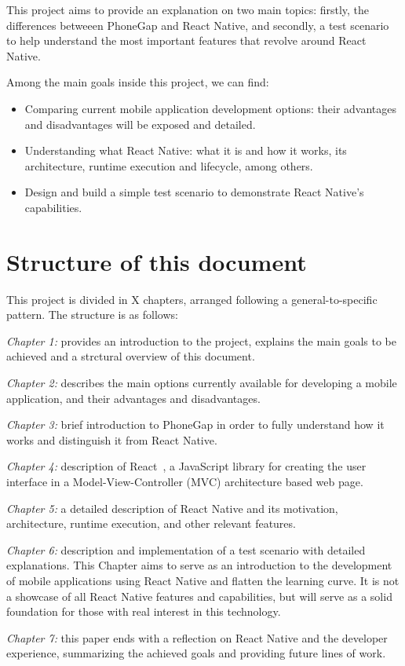 This project aims to provide an explanation on two main topics: firstly, the differences betweeen  PhoneGap and React Native, and secondly, a test scenario to help understand the most important features that revolve around React Native.

Among the main goals inside this project, we can find:

\begin{itemize}  
	\item Comparing current mobile application development options: their advantages and disadvantages will be exposed and detailed.
	\item Understanding what React Native: what it is and how it works, its architecture, runtime execution and lifecycle, among others.
	\item Design and build a simple test scenario to demonstrate React Native's capabilities.
\end{itemize}

\section{Structure of this document}

This project is divided in X chapters, arranged following a general-to-specific pattern. The structure is as follows:

\textit{Chapter 1:} provides an introduction to the project, explains the main goals to be achieved and a strctural overview of this document.

\textit{Chapter 2:} describes the main options currently available for developing a mobile application, and their advantages and disadvantages.

\textit{Chapter 3:} brief introduction to PhoneGap in order to fully understand how it works and distinguish it from React Native.

\textit{Chapter 4:} description of React~\cite{react}, a JavaScript library for creating the user interface in a Model-View-Controller (MVC) architecture based web page.

\textit{Chapter 5:} a detailed description of React Native and its motivation, architecture, runtime execution, and other relevant features.

\textit{Chapter 6:} description and implementation of a test scenario with detailed explanations. This Chapter aims to serve as an introduction to the development of mobile applications using React Native and flatten the learning curve. It is not a showcase of all React Native features and capabilities, but will serve as a solid foundation for those with real interest in this technology.

\textit{Chapter 7:} this paper ends with a reflection on React Native and the developer experience, summarizing the achieved goals and providing future lines of work.